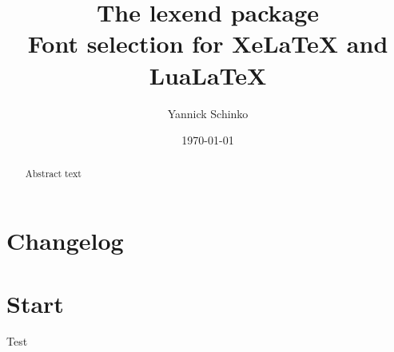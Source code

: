 \documentclass[12pt,oneside,a4paper]{memoir}
\begin{document}
\title{
	The \textsf{lexend} package\\
	\small{Font selection for XeLaTeX and LuaLaTeX}
}
\author{
	Yannick Schinko
}
\date{
	\today\\
}

\maketitle
\newpage

\begin{abstract}
Abstract text
\end{abstract}
\newpage

\tableofcontents
\newpage


\chapter{Changelog}


\chapter{Start}

Test
\end{document}
